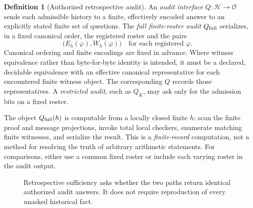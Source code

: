 \documentclass[11pt,letterpaper]{article}
\theoremstyle{definition}
\newtheorem{definition}[theorem]{Definition}
\newcommand{\Hh}{\mathcal H}
\newcommand{\Obs}{\mathcal O}
\begin{document}
\begin{definition}[Authorized retrospective audit]
An \emph{audit interface} $Q:\Hh\to\Obs$ sends each admissible history to a finite, effectively encoded answer to an explicitly stated finite set of questions. The \emph{full finite-roster audit} $Q_{\rm full}$ serializes, in a fixed canonical order, the registered roster and the pairs
\[
\bigl(E_h(\varphi),W_h(\varphi)\bigr)
\quad\text{for each registered }\varphi.
\]
Canonical ordering and finite encodings are fixed in advance. Where witness equivalence rather than byte-for-byte identity is intended, it must be a declared, decidable equivalence with an effective canonical representative for each encountered finite witness object. The corresponding $Q$ records those representatives. A \emph{restricted audit}, such as $Q_K$, may ask only for the admission bits on a fixed roster.
\end{definition}

The object $Q_{\rm full}(h)$ is computable from a locally closed finite $h$: scan the finite proof and message projections, invoke total local checkers, enumerate matching finite witnesses, and serialize the result. This is a \emph{finite-record} computation, not a method for resolving the truth of arbitrary arithmetic statements. For comparisons, either use a common fixed roster or include each varying roster in the audit output.

\begin{figure}[htbp]\centering
{}
\caption{Retrospective sufficiency asks whether the two paths return identical authorized audit answers. It does not require reproduction of every unasked historical fact.}
\label{fig:factor}
\end{figure}
\end{document}

